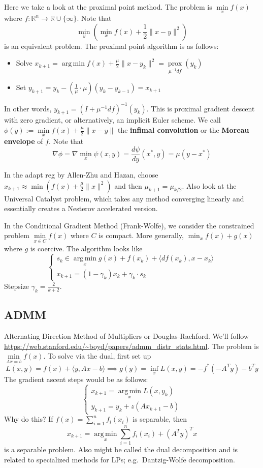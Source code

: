 \documentclass[english, 11pt]{article}
\DeclareMathOperator*{\argmin}{arg\,min}
\DeclareMathOperator*{\prox}{prox}
\begin{document}
Here we take a look at the proximal point method. The problem is $\min \limits_x f(x)$ where $f:\mathbb{R}^n \to \mathbb{R} \cup \{\infty\}$. Note that
\[
\min \limits_y \left( \min \limits_x f(x) + \frac{1}{2} \|x-y\|^2 \right)
\]
is an equivalent problem. The proximal point algorithm is as follows:
\begin{itemize}
\item Solve $x_{k+1} = \argmin f(x) + \frac{\mu}{2} \|x-y_k\|^2 = \prox \limits_{ \mu^{-1} d f} (y_k)$
\item Set $y_{k+1} = y_k - \left( \frac{1}{\mu} \cdot \mu \right) (y_k - y_{k-1}) = x_{k+1}$
\end{itemize}
In other words, $y_{k+1} = (I + \mu^{-1} d f)^{-1} (y_k)$. This is proximal gradient descent with zero gradient, or alternatively, an implicit Euler scheme. We call $\phi(y) := \min \limits_x f(x) + \frac{\mu}{2} \|x-y\|$ the {\bf infimal convolution} or the {\bf Moreau envelope} of $f$. Note that 
\[
\nabla \phi = \nabla \min \limits_x \psi(x,y) = \frac{ d \psi}{dy} (x^*,y) = \mu(y-x^*)
\]
\begin{rem}
In the adapt reg by Allen-Zhu and Hazan, choose $x_{k+1} \approx \min \left( f(x) + \frac{\mu}{2} \|x\|^2 \right)$ and then $\mu_{k+1} = \mu_{k/2}$. Also look at the Universal Catalyst problem, which takes any method converging linearly and essentially creates a Nesterov accelerated version.
\end{rem}

In the Conditional Gradient Method (Frank-Wolfe), we consider the constrained problem $\min \limits_{x \in C} f(x)$ where $C$ is compact. More generally, $\min_x f(x) + g(x)$ where $g$ is coercive. 
The algorithm looks like 
\[
\begin{cases}
s_k \in \argmin \limits_x g(x) + f(x_k) + \langle df(x_k), x- x_k \rangle \\
x_{k+1} = (1 - \gamma_k) x_k + \gamma_k \cdot s_k 
\end{cases}
\]
 Stepsize $\gamma_k = \frac{2}{k+2}$.
 
 
 
 \subsection{ADMM}
 Alternating Direction Method of Multipliers or Douglas-Rachford. We'll follow \url{https://web.stanford.edu/~boyd/papers/admm_distr_stats.html}. The problem is $\min \limits_{Ax=b} f(x)$. To solve via the dual, first set up
 \[
 L(x,y) = f(x) + \langle y, Ax-b \rangle \implies g(y) = \inf \limits_x L(x,y) = -f^*(-A^T y) - b^T y
 \]
 The gradient ascent steps would be as follows:
 \[
 \begin{cases}
 x_{k+1} = \argmin \limits_x L(x,y_k) \\
 y_{k+1} = y_k + z (Ax_{k+1} - b)
 \end{cases}
 \]
 Why do this? If $f(x) = \sum_{i=1}^n f_i(x_i)$ is separable, then
 \[
 x_{k+1} = \argmin \limits_x  \sum_{i=1}^n f_i(x_i) + (A^T y)^T x
 \]
 is a separable problem. Also might be called the dual decomposition and is related to specialized methods for LPs; e.g.\ Dantzig-Wolfe decomposition.
 
\end{document}

